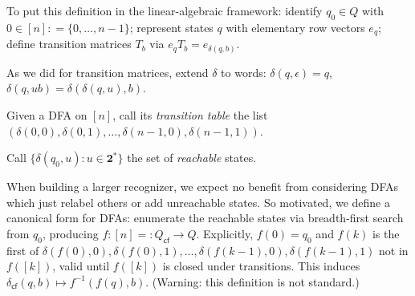 To put this definition in the linear-algebraic framework:
identify $q_0\in Q$ with $0\in [n]\mathrel{\mathop:}=\{0,\ldots,n-1\}$;
represent states $q$ with elementary row vectors $e_q$;
define transition matrices $T_b$ via $e_q T_b = e_{\delta(q, b)}$.

As we did for transition matrices, extend $\delta$ to words: $\delta(q,\epsilon)=q$, $\delta(q,ub)=\delta(\delta(q,u),b)$.

Given a DFA on $[n]$, call its \emph{transition table} the list $(\delta(0,0),\delta(0,1),\ldots,\delta(n-1,0),\delta(n-1,1))$.

Call $\{\delta(q_0,u): u\in\mathbf{2}^*\}$ the set of \emph{reachable} states.

When building a larger recognizer,
we expect no benefit from considering DFAs which just relabel others or add unreachable states.
So motivated, we define a canonical form for DFAs:
enumerate the reachable states via breadth-first search from $q_0$,
producing $f:[n]=\mathrel{\mathop:}Q_\textsf{cf}\to Q$.
Explicitly,
$f(0)=q_0$ and $f(k)$ is the first of
$\delta(f(0),0), \delta(f(0),1), \ldots, \delta(f(k-1),0), \delta(f(k-1),1)$ not in $f([k])$,
valid until $f([k])$ is closed under transitions.
This induces $\delta_\textsf{cf}(q,b)\mapsto f^{-1}(f(q), b)$.
(Warning: this definition is not standard.)

